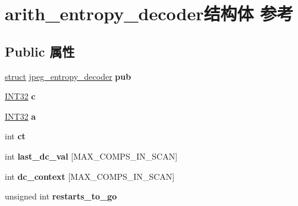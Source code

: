 \hypertarget{structarith__entropy__decoder}{}\section{arith\+\_\+entropy\+\_\+decoder结构体 参考}
\label{structarith__entropy__decoder}
\subsection*{Public 属性}
\begin{DoxyCompactItemize}
\item 
\mbox{\label{structarith__entropy__decoder_a26f1da810c05744076bad3072983d0d1}} 
\hyperlink{interfacestruct}{struct} \hyperlink{structjpeg__entropy__decoder}{jpeg\+\_\+entropy\+\_\+decoder} {\bfseries pub}
\item 
\mbox{\label{structarith__entropy__decoder_abad1e8f477d4015c7069855679885618}} 
\hyperlink{_processor_bind_8h_a1137216524060afd426c34677fed058b}{I\+N\+T32} {\bfseries c}
\item 
\mbox{\label{structarith__entropy__decoder_afb33bbe1e85d3d76b8b119a46db68a77}} 
\hyperlink{_processor_bind_8h_a1137216524060afd426c34677fed058b}{I\+N\+T32} {\bfseries a}
\item 
\mbox{\label{structarith__entropy__decoder_a6c907da02b3db27a4b0f025733a44109}} 
int {\bfseries ct}
\item 
\mbox{\label{structarith__entropy__decoder_afd8cad23cfc049f4ae748308f239bb20}} 
int {\bfseries last\+\_\+dc\+\_\+val} \mbox{[}M\+A\+X\+\_\+\+C\+O\+M\+P\+S\+\_\+\+I\+N\+\_\+\+S\+C\+AN\mbox{]}
\item 
\mbox{\label{structarith__entropy__decoder_a0b9a2123aec7d879cff09e315530d5e8}} 
int {\bfseries dc\+\_\+context} \mbox{[}M\+A\+X\+\_\+\+C\+O\+M\+P\+S\+\_\+\+I\+N\+\_\+\+S\+C\+AN\mbox{]}
\item 
\mbox{\label{structarith__entropy__decoder_ab587034265fc6747822cfb11167e4004}} 
unsigned int {\bfseries restarts\+\_\+to\+\_\+go}

\end{DoxyCompactItemize}
